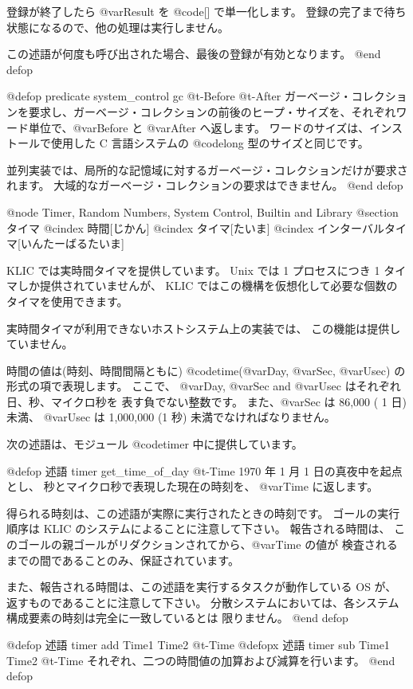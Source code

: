 {{{{登録が終了したら @var{Result} を @code{[]} で単一化します。
登録の完了まで待ち状態になるので、他の処理は実行しません。

この述語が何度も呼び出された場合、最後の登録が有効となります。
@end defop

@defop {predicate} {system_control} gc @t{-}Before @t{-}After
ガーベージ・コレクションを要求し、ガーベージ・コレクションの前後のヒープ・サイズを、それぞれワード単位で、@var{Before} と @var{After} へ返します。
ワードのサイズは、インストールで使用した C 言語システムの @code{long} 型のサイズと同じです。

並列実装では、局所的な記憶域に対するガーベージ・コレクションだけが要求されます。
大域的なガーベージ・コレクションの要求はできません。
@end defop

@node Timer, Random Numbers, System Control, Builtin and Library
@section タイマ
@cindex 時間[じかん]
@cindex タイマ[たいま]
@cindex インターバルタイマ[いんたーばるたいま]

KLIC では実時間タイマを提供しています。
Unix では 1 プロセスにつき 1 タイマしか提供されていませんが、
KLIC ではこの機構を仮想化して必要な個数のタイマを使用できます。

実時間タイマが利用できないホストシステム上の実装では、
この機能は提供していません。

時間の値は(時刻、時間間隔ともに) @code{time(@var{Day}, @var{Sec}, @var{Usec})} 
の形式の項で表現します。
ここで、 @var{Day}, @var{Sec} and @var{Usec} はそれぞれ日、秒、マイクロ秒を
表す負でない整数です。
また、@var{Sec} は 86,000 ( 1 日)未満、 @var{Usec} は 1,000,000 (1 秒)
未満でなければなりません。

次の述語は、モジュール @code{timer} 中に提供しています。

@defop {述語} {timer} get_time_of_day @t{-}Time
1970 年 1 月 1 日の真夜中を起点とし、
秒とマイクロ秒で表現した現在の時刻を、 @var{Time} に返します。

得られる時刻は、この述語が実際に実行されたときの時刻です。
ゴールの実行順序は KLIC のシステムによることに注意して下さい。
報告される時間は、
このゴールの親ゴールがリダクションされてから、@var{Time} の値が
検査されるまでの間であることのみ、保証されています。

また、報告される時間は、この述語を実行するタスクが動作している OS が、
返すものであることに注意して下さい。
分散システムにおいては、各システム構成要素の時刻は完全に一致しているとは
限りません。
@end defop

@defop {述語} {timer} add Time1 Time2 @t{-}Time
@defopx {述語} {timer} sub Time1 Time2 @t{-}Time
それぞれ、二つの時間値の加算および減算を行います。
@end defop

}}}}
